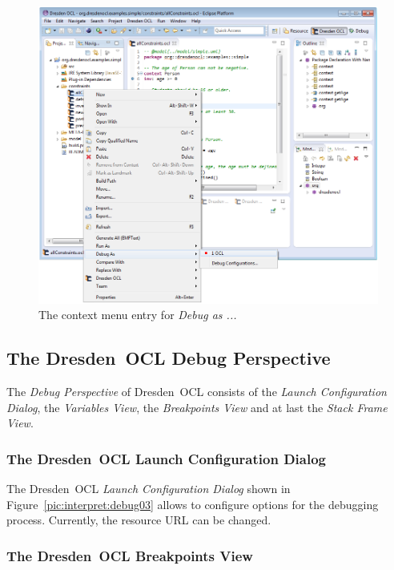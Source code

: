 \begin{figure}[tbp]
	\centering
	\includegraphics[width=\textwidth,height=\textheight,keepaspectratio]{figures/interpreter/debug01}
  \caption{The context menu entry for \emph{Debug as ...}}
  \label{pic:interpret:debug01}
\end{figure}

\subsection{The Dresden~OCL Debug Perspective}

The \emph{Debug Perspective} of Dresden~OCL consists of the \emph{Launch
Configuration Dialog}, the \emph{Variables View}, the \emph{Breakpoints View}
and at last the \emph{Stack Frame View}.

\subsubsection{The Dresden~OCL Launch Configuration Dialog}

The Dresden~OCL \emph{Launch Configuration Dialog} shown in
Figure~\ref{pic:interpret:debug03} allows to configure options for the
debugging process. Currently, the resource URL can be changed.

\subsubsection{The Dresden~OCL Breakpoints View}

